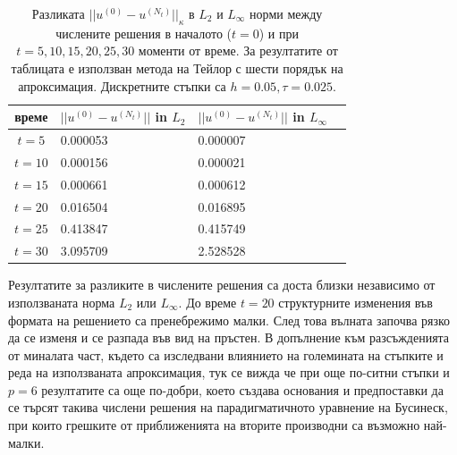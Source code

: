 \documentclass{article}
\theoremstyle{remark}
\begin{document}
\begin{table}[ht]
\centering
\small
		\begin{tabular}{||c|l|l|l||}
			\hline
			\hline
  време   &  $||u^{(0)} - u^{(N_t)}||$ in $L_2$  & $||u^{(0)} - u^{(N_t)}||$ in $L_\infty$   \\
   		      \hline 
			\hline
  $t=5$     & 0.000053 & 0.000007      \\
			\hline 
  $t=10$   & 0.000156 & 0.000021      \\
			\hline 
  $t=15$   & 0.000661 & 0.000612      \\
	   \hline
  $t=20$   & 0.016504 & 0.016895      \\
			\hline
  $t=25$   & 0.413847 & 0.415749      \\
    \hline
  $t=30$   & 3.095709 & 2.528528       \\
	   \hline
		\hline 
		\end{tabular}
		\caption{Разликата $||u^{(0)} - u^{(N_t)}||_\kappa$ в $L_2$ и $L_\infty$ норми между числените решения в началото ($t=0$) и при $t=5, 10, 15, 20, 25, 30$ моменти от време. За резултатите от таблицата е използван метода на Тейлор с шести порядък на апроксимация. Дискретните стъпки са $h=0.05, \tau = 0.025$. }
\label{tableJ}
\end{table}
\FloatBarrier
Резултатите за разликите в числените решения са доста близки независимо от използваната норма $L_2$ или $L_\infty$. До време $t=20$ структурните изменения във формата на решението са пренебрежимо малки. След това вълната започва рязко да се изменя и се разпада във вид на пръстен. В допълнение към разсъжденията от миналата част, където са изследвани влиянието на големината на стъпките и реда на използваната апроксимация, тук се вижда че при още по-ситни стъпки и $p=6$ резултатите са още по-добри, което създава основания и предпоставки да се търсят такива числени решения на парадигматичното уравнение на Бусинеск, при които грешките от приближенията на вторите производни са възможно най-малки.
\end{document}
